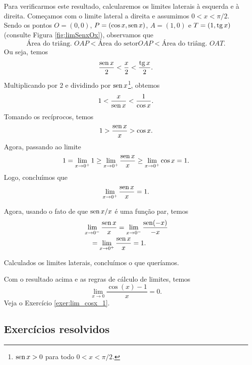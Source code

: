 Para verificarmos este resultado, calcularemos os limites laterais à esquerda e à direita. Começamos com o limite lateral a direita e assumimos $0<x<\pi/2$. Sendo os pontos $O=(0,0)$, $P=(\cos x,\operatorname{sen} x)$, $A = (1,0)$ e $T = (1, \operatorname{tg} x)$ (consulte Figura \ref{fig:limSenxOx}), observamos que
\begin{equation}
  \text{Área do triâng. } OAP < \text{Área do setor} OAP < \text{Área do triâng. } OAT.
\end{equation}
Ou seja, temos
\begin{equation}
  \frac{\operatorname{sen} x}{2} < \frac{x}{2} < \frac{\operatorname{tg} x}{2}.
\end{equation}
Multiplicando por $2$ e dividindo por $\operatorname{sen} x$\footnote{$\operatorname{sen} x > 0$ para todo $0< x < \pi/2$.}, obtemos
\begin{equation}
  1 < \frac{x}{\operatorname{sen} x} < \frac{1}{\cos x}.
\end{equation}
Tomando os recíprocos, temos
\begin{equation}
  1 > \frac{\operatorname{sen} x}{x} > \cos x.
\end{equation}
Agora, passando ao limite
\begin{equation}
  1 = \lim_{x\to 0^+} 1 \geq \lim_{x\to 0^+} \frac{\operatorname{sen} x}{x} \geq \lim_{x\to 0^+} \cos x = 1.
\end{equation}
Logo, concluímos que
\begin{equation}
  \lim_{x\to 0^+} \frac{\operatorname{sen} x}{x} = 1.
\end{equation}

Agora, usando o fato de que $\operatorname{sen} x/x$ é uma função par, temos
\begin{align}
  & \lim_{x\to 0^-} \frac{\operatorname{sen} x}{x} = \lim_{x\to 0^-} \frac{\operatorname{sen}(-x)}{-x} \\
  & \text{}\quad = \lim_{x\to 0^+} \frac{\operatorname{sen} x}{x} = 1.
\end{align}

Calculados os limites laterais, concluímos o que queríamos.

\begin{ex}
  Com o resultado acima e as regras de cálculo de limites, temos
  \begin{equation}
    \lim_{x\to 0} \frac{\cos(x) - 1}{x} = 0.
  \end{equation}
  Veja o Exercício \ref{exer:lim_cosx_1}.
\end{ex}

\subsection{Exercícios resolvidos}

